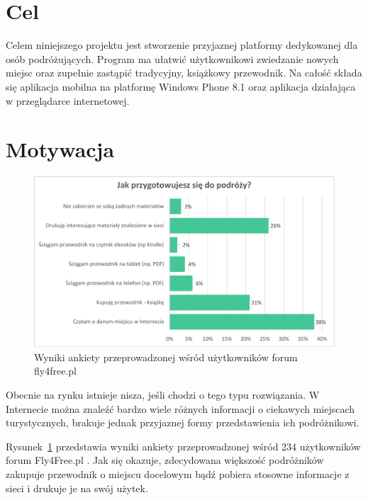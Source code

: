 \documentclass{book}
\begin{document}
		\section{Cel}
		Celem niniejszego projektu jest stworzenie przyjaznej platformy dedykowanej dla osób podróżujących. Program ma ułatwić użytkownikowi zwiedzanie nowych miejsc oraz zupełnie zastąpić tradycyjny, książkowy przewodnik. Na całość składa się aplikacja mobilna na platformę Windows Phone 8.1 oraz aplikacja działająca w przeglądarce internetowej. 

		\section{Motywacja}
	
		\begin{figure}		
			\centering
			\includegraphics[width=1.0\textwidth]{fly4freeAnkieta.pdf}
			\caption{Wyniki ankiety przeprowadzonej wśród użytkowników forum fly4free.pl}
			\label{fig:fly4freeAnkieta}
		\end{figure}
	
		Obecnie na rynku istnieje nisza, jeśli chodzi o tego typu rozwiązania. W Internecie można znaleźć bardzo wiele różnych informacji o ciekawych miejscach turystycznych, brakuje jednak przyjaznej formy przedstawienia ich podróżnikowi. 
		
		Rysunek~\ref{fig:fly4freeAnkieta} przedstawia wyniki ankiety przeprowadzonej wśród 234 użytkowników forum Fly4Free.pl \cite{id:fly4free} . Jak się okazuje, zdecydowana większość podróżników zakupuje przewodnik o miejscu docelowym bądź pobiera stosowne informacje z sieci i drukuje je na swój użytek.
		
\end{document}
